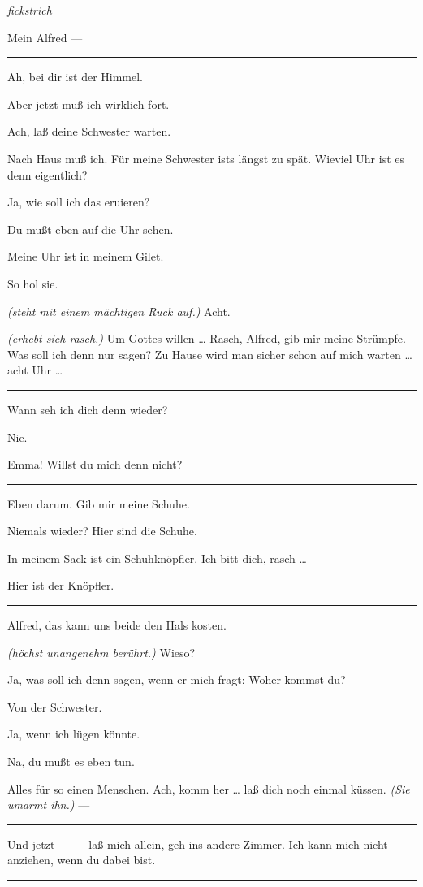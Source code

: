 \documentclass[
	final,
	a4paper,
	ngerman,
	mpinclude = true, %
	twoside = true,
	open = right,
	cleardoublepage = plain,
	DIV = 13,
	BCOR = 1cm,
	titlepage = firstiscover,
	]{scrbook}
\newcommand{\direction}[1]{\textit{(#1)}}
\newcommand{\hiat}{%
	\begin{center}
		\tiny
		\raisebox{0.5ex}{\rule{0.3\linewidth}{0.4pt}}
		\textit{fickstrich}
		\raisebox{0.5ex}{\rule{0.3\linewidth}{0.4pt}}
	\end{center}
}
\newenvironment{deletion}{%
		\vspace{0.25\baselineskip}
		\hrule
		\vspace{0.25\baselineskip}
		\color{darkgray}
	}{
		\color{black}
		\vspace{0.25\baselineskip}
		\hrule 
		\vspace{0.25\baselineskip}
	}
\newcommand{\thecharacter}[1]{\textup{\textsc{#1}}\xspace}
\newcommand{\theherr}{\thecharacter{Benjamin}}
\newcommand{\thefrau}{\thecharacter{Emma}}
\newcommand{\character}[1]{\item[#1:]}
\newcommand{\herr}{\character{\theherr}}
\newcommand{\frau}{\character{\thefrau}}
\begin{document}
\begin{play}
	\hiat

	\frau
	Mein Alfred ---

	\begin{deletion}
	\herr
	Ah, bei dir ist der Himmel.

	\frau
	Aber jetzt muß ich wirklich fort.

	\herr
	Ach, laß deine Schwester warten.

	\frau
	Nach Haus muß ich. Für meine Schwester ists längst zu spät. Wieviel Uhr ist es denn eigentlich?

	\herr
	Ja, wie soll ich das eruieren?

	\frau
	Du mußt eben auf die Uhr sehen.

	\herr
	Meine Uhr ist in meinem Gilet.

	\frau
	So hol sie.

	\herr
	\direction{steht mit einem mächtigen Ruck auf.} Acht.

	\frau
	\direction{erhebt sich rasch.} Um Gottes willen \ldots{} Rasch, Alfred, gib mir meine Strümpfe. Was soll ich denn nur sagen? Zu Hause wird man sicher schon auf mich warten \ldots{} acht Uhr \ldots{}
	\end{deletion}

	\herr
	Wann seh ich dich denn wieder?

	\frau
	Nie.

	\herr
	Emma! Willst du  mich denn nicht?

	\begin{deletion}
	\frau
	Eben darum. Gib mir meine Schuhe.

	\herr
	Niemals wieder? Hier sind die Schuhe.

	\frau
	In meinem Sack ist ein Schuhknöpfler. Ich bitt dich, rasch \ldots{}

	\herr
	Hier ist der Knöpfler.
	\end{deletion}

	\frau
	Alfred, das kann uns beide den Hals kosten.

	\herr
	\direction{höchst unangenehm berührt.} Wieso?

	\frau
	Ja, was soll ich denn sagen, wenn er mich fragt: Woher kommst du?

	\herr
	Von der Schwester.

	\frau
	Ja, wenn ich lügen könnte.

	\herr
	Na, du mußt es eben tun.

	\frau
	Alles für so einen Menschen. Ach, komm her \ldots{} laß dich noch einmal küssen. \direction{Sie umarmt ihn.} ---
	\begin{deletion}
	Und jetzt --- --- laß mich allein, geh ins andere Zimmer. Ich kann mich nicht anziehen, wenn du dabei bist.


\end{deletion}
\end{play}
\end{document}
